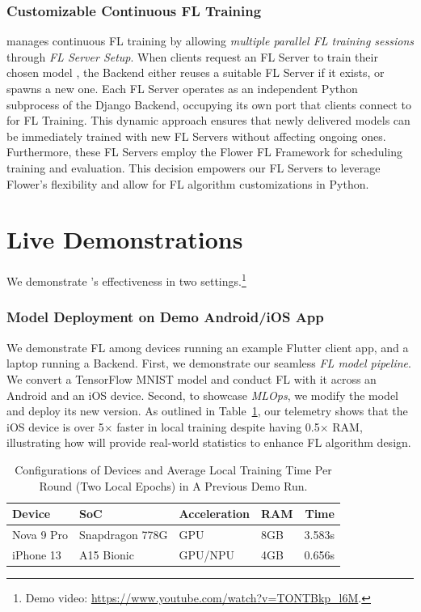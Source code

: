 \documentclass[conference]{IEEEtran}
\begin{document}
\subsubsection{Customizable Continuous FL Training}
\FedKit{} manages continuous FL training by allowing \textit{multiple parallel FL training sessions}
through \textit{FL Server Setup}.
When clients request an FL Server to
train their chosen model \model{},
the Backend either reuses a suitable FL Server \fs{} if it exists,
or spawns a new one.
Each FL Server
operates as an independent Python subprocess of the Django Backend,
occupying its own port that
clients connect to for FL Training.
This dynamic approach ensures that
newly delivered models can be immediately trained with new FL Servers
without affecting ongoing ones.
Furthermore,
these FL Servers employ the Flower FL Framework for
scheduling training and evaluation.
This decision empowers our FL Servers to leverage Flower's flexibility and
allow for FL algorithm customizations in Python.

\section{Live Demonstrations}

We demonstrate \FedKit{}'s effectiveness in two settings.\footnote{
    Demo video: \url{https://www.youtube.com/watch?v=TONTBkp_l6M}.
}

\subsubsection{Model Deployment on Demo Android/iOS App}
We demonstrate FL among
devices running an example Flutter client app,
and a laptop running a \FedKit{} Backend.
First, we demonstrate our seamless \textit{FL model pipeline}.
We convert a TensorFlow MNIST model and
conduct FL with it across an Android and an iOS device.
Second, to showcase \textit{MLOps},
we modify the model and deploy its new version.
As outlined in Table~\ref{tbl:demo-stats},
our telemetry shows that
the iOS device is over 5$\times$ faster in local training despite
having 0.5$\times$ RAM,
illustrating how \FedKit{} will provide real-world statistics to
enhance FL algorithm design.

\begin{table}
    \centering
    \small
    \setlength{\tabcolsep}{5pt}
\begin{tabular}{llllr}
Device      & SoC               & Acceleration  & RAM   & Time   \\\hline
Nova 9 Pro  & Snapdragon 778G   & GPU           & 8GB   & 3.583s \\
iPhone 13   & A15 Bionic        & GPU/NPU       & 4GB   & 0.656s \\
\end{tabular}
\caption{Configurations of Devices and Average Local Training Time Per Round
    (Two Local Epochs) in A Previous Demo Run.
}
\label{tbl:demo-stats}
\end{table}
\end{document}

